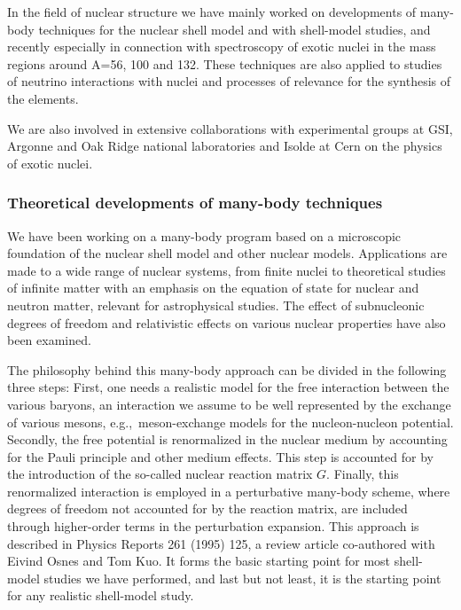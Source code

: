 In the field of nuclear structure 
we have mainly worked on developments of many-body techniques 
for the nuclear shell model and with shell-model studies, 
and recently
especially in connection with spectroscopy of exotic nuclei 
in the mass regions around A=56, 100 and 132.
These techniques are also applied to studies of  
neutrino interactions with nuclei and processes of relevance
for the synthesis of the elements.

We are also involved in
extensive collaborations with experimental groups at GSI, 
Argonne and Oak Ridge national laboratories and Isolde at Cern
on the physics of exotic nuclei. 



\subsubsection{Theoretical developments of many-body techniques}

We have been working on a many-body program
based on a microscopic
foundation of the nuclear shell model and other nuclear models.
Applications are made
to a wide range of nuclear systems, from finite nuclei to
theoretical studies of infinite matter with an emphasis
on the equation of state for
nuclear and neutron matter, relevant for astrophysical
studies. The effect of subnucleonic degrees of freedom and
relativistic effects on
various nuclear properties have also been examined.

The philosophy behind this  many-body approach can be
divided in the following three steps:\newline
First, one needs a realistic model for the free
interaction between the various
baryons, an interaction we assume to be well represented
by the exchange of various mesons,
e.g.,\ meson-exchange models for
the nucleon-nucleon potential. 
Secondly, the free potential is renormalized
in the nuclear medium by accounting for the Pauli principle
and other medium effects. This step is
accounted for by the introduction of the so-called
nuclear reaction matrix $G$.
Finally, this renormalized
interaction is employed in a perturbative many-body
scheme, where degrees of freedom not accounted for by the
reaction matrix, are included through higher-order terms in the
perturbation
expansion. This approach is described in Physics Reports
261 (1995) 125, a review article co-authored
with Eivind Osnes and Tom Kuo. 
It forms the basic starting point for most shell-model
studies we have performed, and last but not least, it is
the starting point for any realistic shell-model study.

